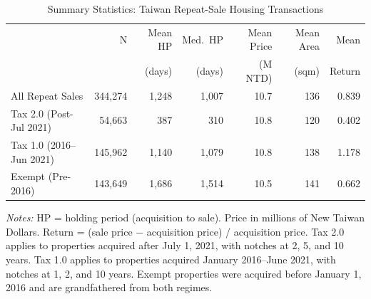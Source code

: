\begin{table}[htbp]
\centering
\caption{Summary Statistics: Taiwan Repeat-Sale Housing Transactions}
\label{tab:summary}
\small
\begin{tabular}{lrrrrrr}
\toprule
 & N & Mean HP & Med.\ HP & Mean Price & Mean Area & Mean \\
 & & (days) & (days) & (M NTD) & (sqm) & Return \\
\midrule
All Repeat Sales & 344,274 & 1,248 & 1,007 & 10.7 & 136 & 0.839 \\
\midrule
Tax 2.0 (Post-Jul 2021) & 54,663 & 387 & 310 & 10.8 & 120 & 0.402 \\
Tax 1.0 (2016--Jun 2021) & 145,962 & 1,140 & 1,079 & 10.8 & 138 & 1.178 \\
Exempt (Pre-2016) & 143,649 & 1,686 & 1,514 & 10.5 & 141 & 0.662 \\
\bottomrule
\end{tabular}

\vspace{0.3em}
{\footnotesize \textit{Notes:} HP = holding period (acquisition to sale). Price in millions of New Taiwan Dollars. Return = (sale price $-$ acquisition price) / acquisition price. Tax 2.0 applies to properties acquired after July 1, 2021, with notches at 2, 5, and 10 years. Tax 1.0 applies to properties acquired January 2016--June 2021, with notches at 1, 2, and 10 years. Exempt properties were acquired before January 1, 2016 and are grandfathered from both regimes.\par}
\end{table}
